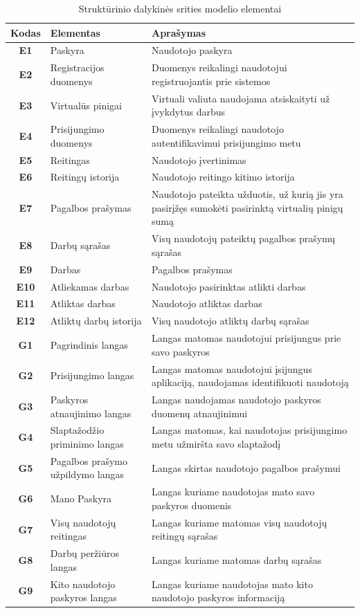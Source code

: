 \documentclass{VUMIFPSbakalaurinis}
\begin{document}
\begin{table}[H]\footnotesize
	\centering
	\caption{Struktūrinio dalykinės srities modelio elementai}
	{
	\setlength{\arrayrulewidth}{0.25mm}
	{\begin{tabular}{|c|m{5.75cm}|m{5.75cm}|} \hline
		Kodas & Elementas & Aprašymas \\
		\hline
		\textbf{E1} & Paskyra & Naudotojo paskyra \\
		\textbf{E2} & Registracijos duomenys & Duomenys reikalingi naudotojui registruojantis prie sistemos \\
		\textbf{E3} & Virtualūs pinigai & Virtuali valiuta naudojama atsiskaityti už įvykdytus darbus \\
		\textbf{E4} & Prisijungimo duomenys & Duomenys reikalingi naudotojo autentifikavimui prisijungimo metu \\
		\textbf{E5} & Reitingas & Naudotojo įvertinimas \\
		\textbf{E6} & Reitingų istorija & Naudotojo reitingo kitimo istorija \\
		\textbf{E7} & Pagalbos prašymas & Naudotojo pateikta užduotis, už kurią jis yra pasirįžęs sumokėti pasirinktą virtualių pinigų sumą \\
		\textbf{E8} & Darbų sąrašas & Visų naudotojų pateiktų pagalbos prašymų sąrašas \\
		\textbf{E9} & Darbas & Pagalbos prašymas \\
		\textbf{E10} & Atliekamas darbas & Naudotojo pasirinktas atlikti darbas \\
		\textbf{E11} & Atliktas darbas & Naudotojo atliktas darbas \\
		\textbf{E12} & Atliktų darbų istorija & Visų naudotojo atliktų darbų sąrašas \\
		\hline
		\textbf{G1} & Pagrindinis langas & Langas matomas naudotojui prisijungus prie savo paskyros \\
		\textbf{G2} & Prisijungimo langas & Langas matomas naudotojui įsijungus aplikaciją, naudojamas identifikuoti naudotoją \\
		\textbf{G3} & Paskyros atnaujinimo langas & Langas naudojamas naudotojo paskyros duomenų atnaujinimui \\
		\textbf{G4} & Slaptažodžio priminimo langas & Langas matomas, kai naudotojas prisijungimo metu užmiršta savo slaptažodį \\
		\textbf{G5} & Pagalbos prašymo užpildymo langas & Langas skirtas naudotojo pagalbos prašymui \\
		\textbf{G6} & Mano Paskyra & Langas kuriame naudotojas mato savo paskyros duomenis \\
		\textbf{G7} & Visų naudotojų reitingas & Langas kuriame matomas visų naudotojų reitingų sąrašas \\
		\textbf{G8} & Darbų peržiūros langas & Langas kuriame matomas darbų sąrašas \\
		\textbf{G9} & Kito naudotojo paskyros langas & Langas kuriame naudotojas mato kito naudotojo paskyros informaciją \\
		\hline
	\end{tabular}}
	}
	\label{tab:entity table}
\end{table}
\end{document}
